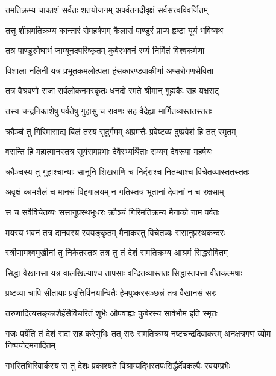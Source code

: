 \twolineshloka
{तमतिक्रम्य चाकाशं सर्वतः शतयोजनम्}
{अपर्वतनदीवृक्षं सर्वसत्त्वविवर्जितम्} %

\twolineshloka
{तत्तु शीघ्रमतिक्रम्य कान्तारं रोमहर्षणम्}
{कैलासं पाण्डुरं प्राप्य हृष्टा यूयं भविष्यथ} %

\twolineshloka
{तत्र पाण्डुरमेघाभं जाम्बूनदपरिष्कृतम्}
{कुबेरभवनं रम्यं निर्मितं विश्वकर्मणा} %

\twolineshloka
{विशाला नलिनी यत्र प्रभूतकमलोत्पला}
{हंसकारण्डवाकीर्णा अप्सरोगणसेविता} %

\twolineshloka
{तत्र वैश्रवणो राजा सर्वलोकनमस्कृतः}
{धनदो रमते श्रीमान् गुह्यकैः सह यक्षराट्} %

\twolineshloka
{तस्य चन्द्रनिकाशेषु पर्वतेषु गुहासु च}
{रावणः सह वैदेह्या मार्गितव्यस्ततस्ततः} %

\twolineshloka
{क्रौञ्चं तु गिरिमासाद्य बिलं तस्य सुदुर्गमम्}
{अप्रमत्तैः प्रवेष्टव्यं दुष्प्रवेशं हि तत् स्मृतम्} %

\twolineshloka
{वसन्ति हि महात्मानस्तत्र सूर्यसमप्रभाः}
{देवैरभ्यर्थिताः सम्यग् देवरूपा महर्षयः} %

\twolineshloka
{क्रौञ्चस्य तु गुहाश्चान्याः सानूनि शिखराणि च}
{निर्दराश्च नितम्बाश्च विचेतव्यास्ततस्ततः} %

\twolineshloka
{अवृक्षं कामशैलं च मानसं विहगालयम्}
{न गतिस्तत्र भूतानां देवानां न च रक्षसाम्} %

\twolineshloka
{स च सर्वैर्विचेतव्यः ससानुप्रस्थभूधरः}
{क्रौञ्चं गिरिमतिक्रम्य मैनाको नाम पर्वतः} %

\twolineshloka
{मयस्य भवनं तत्र दानवस्य स्वयङ्कृतम्}
{मैनाकस्तु विचेतव्यः ससानुप्रस्थकन्दरः} %

\twolineshloka
{स्त्रीणामश्वमुखीनां तु निकेतस्तत्र तत्र तु}
{तं देशं समतिक्रम्य आश्रमं सिद्धसेवितम्} %

\twolineshloka
{सिद्धा वैखानसा यत्र वालखिल्याश्च तापसाः}
{वन्दितव्यास्ततः सिद्धास्तपसा वीतकल्मषाः} %

\twolineshloka
{प्रष्टव्या चापि सीतायाः प्रवृत्तिर्विनयान्वितैः}
{हेमपुष्करसञ्छन्नं तत्र वैखानसं सरः} %

\twolineshloka
{तरुणादित्यसङ्काशैर्हंसैर्विचरितं शुभैः}
{औपवाह्यः कुबेरस्य सार्वभौम इति स्मृतः} %

\threelineshloka
{गजः पर्येति तं देशं सदा सह करेणुभिः}
{तत् सरः समतिक्रम्य नष्टचन्द्रदिवाकरम्}
{अनक्षत्रगणं व्योम निष्पयोदमनादितम्} %

\twolineshloka
{गभस्तिभिरिवार्कस्य स तु देशः प्रकाश्यते}
{विश्राम्यद्भिस्तपःसिद्धैर्देवकल्पैः स्वयम्प्रभैः} %

